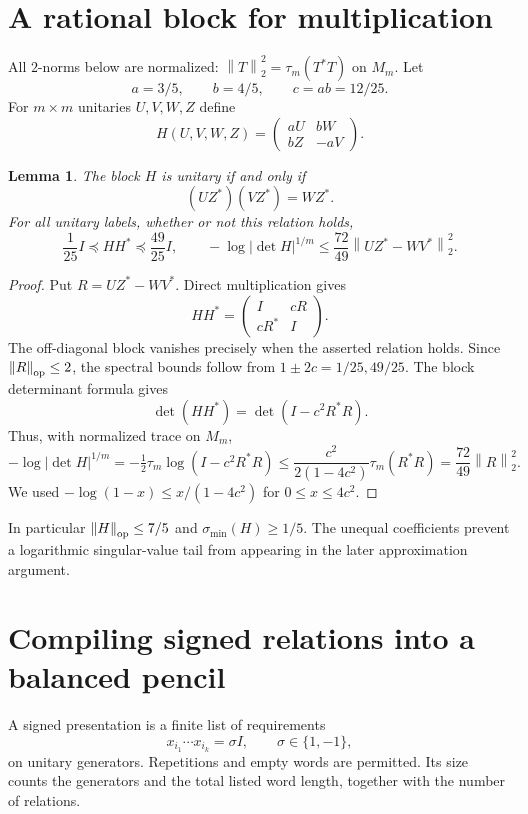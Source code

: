 \documentclass[11pt]{article}
\newtheorem{lemma}[theorem]{Lemma}
\newcommand{\norm}[1]{\left\lVert#1\right\rVert}
\begin{document}
\section{A rational block for multiplication}
All $2$-norms below are normalized: $\norm T_2^2=\tau_m(T^*T)$ on $M_m$.
Let
\[
 a=3/5,\qquad b=4/5,\qquad c=ab=12/25.
\]
For $m\times m$ unitaries $U,V,W,Z$ define
\begin{equation}
 H(U,V,W,Z)=
 \begin{pmatrix}aU&bW\\bZ&-aV\end{pmatrix}. \label{eq:block}
\end{equation}
\begin{lemma}\label{lem:block}
The block $H$ is unitary if and only if
\[
 (UZ^*)(VZ^*)=WZ^*.
\]
For all unitary labels, whether or not this relation holds,
\begin{equation}
 \frac1{25}I\preceq HH^*\preceq\frac{49}{25}I,\qquad
 -\log|\det H|^{1/m}\le\frac{72}{49}\norm{UZ^*-WV^*}_2^2. \label{eq:blockbounds}
\end{equation}
\end{lemma}
\begin{proof}
Put $R=UZ^*-WV^*$. Direct multiplication gives
\[
 HH^*=\begin{pmatrix}I&cR\\cR^*&I\end{pmatrix}.
\]
The off-diagonal block vanishes precisely when the asserted relation holds. Since $\norm R_{\rm op}\le2$, the spectral bounds follow from $1\pm2c=1/25,49/25$. The block determinant formula gives
\[
 \det(HH^*)=\det(I-c^2R^*R).
\]
Thus, with normalized trace on $M_m$,
\[
 -\log|\det H|^{1/m}
 =-\tfrac12\tau_m\log(I-c^2R^*R)
 \le\frac{c^2}{2(1-4c^2)}\tau_m(R^*R)
 =\frac{72}{49}\norm R_2^2.
\]
We used $-\log(1-x)\le x/(1-4c^2)$ for $0\le x\le4c^2$.
\end{proof}
In particular $\norm H_{\rm op}\le7/5$ and $\sigma_{\min}(H)\ge1/5$. The unequal coefficients prevent a logarithmic singular-value tail from appearing in the later approximation argument.

\section{Compiling signed relations into a balanced pencil}
A signed presentation is a finite list of requirements
\begin{equation}
 x_{i_1}\cdots x_{i_k}=\sigma I,\qquad \sigma\in\{1,-1\}, \label{eq:words}
\end{equation}
on unitary generators. Repetitions and empty words are permitted. Its size counts the generators and the total listed word length, together with the number of relations.
\end{document}
